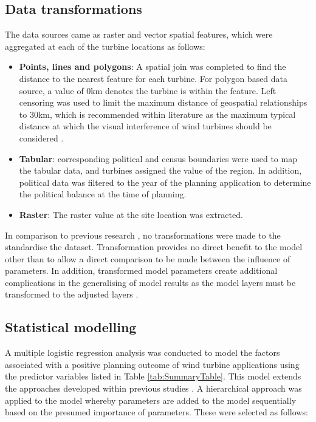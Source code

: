 \documentclass[a4paper,]{article}
\providecommand{\tightlist}{%
  \setlength{\itemsep}{0pt}\setlength{\parskip}{0pt}}
\theoremstyle{definition}
\theoremstyle{definition}
\theoremstyle{definition}
\theoremstyle{remark}
\begin{document}
\hypertarget{data-transformations}{%
\subsection{Data transformations}\label{data-transformations}}

The data sources came as raster and vector spatial features, which were aggregated at each of the turbine locations as follows:

\begin{itemize}
\tightlist
\item
  \textbf{Points, lines and polygons}: A spatial join was completed to find the distance to the nearest feature for each turbine. For polygon based data source, a value of 0km denotes the turbine is within the feature. Left censoring was used to limit the maximum distance of geospatial relationships to 30km, which is recommended within literature as the maximum typical distance at which the visual interference of wind turbines should be considered \citep{SNH2009}.
\item
  \textbf{Tabular}: corresponding political and census boundaries were used to map the tabular data, and turbines assigned the value of the region. In addition, political data was filtered to the year of the planning application to determine the political balance at the time of planning.
\item
  \textbf{Raster}: The raster value at the site location was extracted.
\end{itemize}

In comparison to previous research \citep{VanRensburg20}, no transformations were made to the standardise the dataset. Transformation provides no direct benefit to the model other than to allow a direct comparison to be made between the influence of parameters. In addition, transformed model parameters create additional complications in the generalising of model results as the model layers must be transformed to the adjusted layers \citep[p.123]{Harrell2001}.

\hypertarget{statistical-modelling}{%
\subsection{Statistical modelling}\label{statistical-modelling}}

A multiple logistic regression analysis was conducted to model the factors associated with a positive planning outcome of wind turbine applications using the predictor variables listed in Table \ref{tab:SummaryTable}. This model extends the approaches developed within previous studies \citep{Toke2005, VanRensburg20, Roddis2018}. A hierarchical approach was applied to the model whereby parameters are added to the model sequentially based on the presumed importance of parameters. These were selected as follows:
\end{document}
